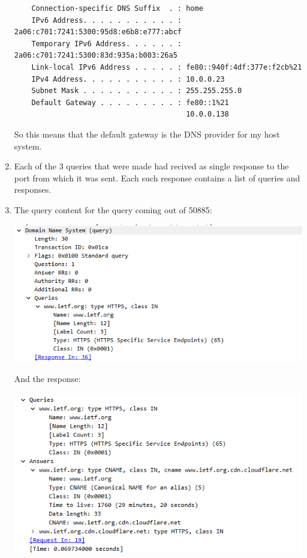 \begin{enumerate}[label=\textbf{\alph*.}]
\begin{verbatim}
    Connection-specific DNS Suffix  . : home
    IPv6 Address. . . . . . . . . . . : 2a06:c701:7241:5300:95d8:e6b8:e777:abcf
    Temporary IPv6 Address. . . . . . : 2a06:c701:7241:5300:83d:935a:b003:26a5
    Link-local IPv6 Address . . . . . : fe80::940f:4df:377e:f2cb%21
    IPv4 Address. . . . . . . . . . . : 10.0.0.23
    Subnet Mask . . . . . . . . . . . : 255.255.255.0
    Default Gateway . . . . . . . . . : fe80::1%21
                                        10.0.0.138
    \end{verbatim}
    So this means that the default gateway is the DNS provider for my host system.
    \item Each of the 3 queries that were made had recived as single response to the port from
    which it was sent. Each such response contains a list of queries and responses.
    \item The query content for the query coming out of 50885:
    \begin{center}
        \includegraphics[width=1.2 \textwidth]{resources/dns3.png}\centering
    \end{center}
    And the response:
    \begin{center}
        \includegraphics[width=1.2 \textwidth]{resources/dns2.png}\centering

\end{center}
\end{enumerate}
